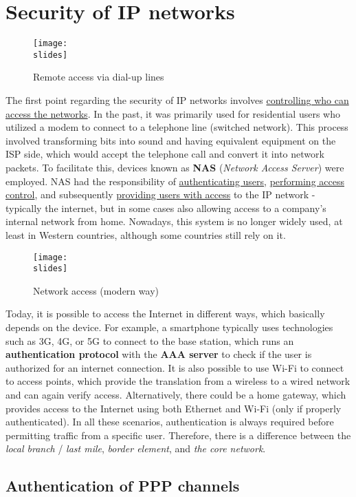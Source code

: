 \chapter{Security of IP networks}

\begin{figure}[h]
    \centering
    \texttt{[image: \\slides]}
    \caption{Remote access via dial-up lines}
\end{figure}

The first point regarding the security of IP networks involves \ul{controlling who can access the networks}. 
In the past, it was primarily used for residential users who utilized a modem to connect to a telephone line (switched network). 
This process involved transforming bits into sound and having equivalent equipment on the ISP side, which would accept the telephone call and convert it into network packets. 
To facilitate this, devices known as \textbf{NAS} (\textit{Network Access Server}) were employed. 
NAS had the responsibility of \underline{authenticating users}, \underline{performing access control}, and subsequently \underline{providing users with access} to the IP network - typically the internet, but in some cases also allowing access to a company's internal network from home. 
Nowadays, this system is no longer widely used, at least in Western countries, although some countries still rely on it.


\begin{figure}[h]
    \centering
    \texttt{[image: \\slides]}
    \caption{Network access (modern way)}
\end{figure}

Today, it is possible to access the Internet in different ways, which basically depends on the device. 
For example, a smartphone typically uses technologies such as 3G, 4G, or 5G to connect to the base station, which runs an \textbf{authentication protocol} with the \textbf{AAA server} to check if the user is authorized for an internet connection. 
It is also possible to use Wi-Fi to connect to access points, which provide the translation from a wireless to a wired network and can again verify access. 
Alternatively, there could be a home gateway, which provides access to the Internet using both Ethernet and Wi-Fi (only if properly authenticated). 
In all these scenarios, authentication is always required before permitting traffic from a specific user. 
Therefore, there is a difference between the \textit{local branch} / \textit{last mile}, \textit{border element}, and \textit{the core network}.



\section{Authentication of PPP channels}
